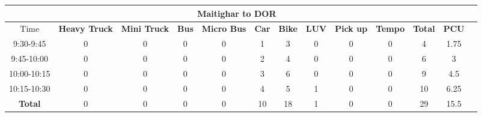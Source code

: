 \begin{landscape}
\begin{table}[h!]
\vspace{0.5cm}

\begin{tabular}{|c|c|c|c|c|c|c|c|c|c|c|c|c|}
    \hline
    \multicolumn{12}{|c|}{\textbf{Maitighar to DOR}} \\
    \hline
        Time & \textbf{Heavy Truck} & \textbf{Mini Truck} & \textbf{Bus} & \textbf{Micro Bus} & \textbf{Car} & \textbf{Bike} & \textbf{LUV} & \textbf{Pick up} & \textbf{Tempo} & \textbf{\textbf{Total}} & \textbf{PCU} \\
    \hline
    9:30-9:45	&0	&0	&0	&0	&1	&3	&0	&0	&0	&4	&1.75 \\ \hline
    9:45-10:00	&0	&0	&0	&0	&2	&4	&0	&0	&0	&6	&3 \\ \hline
    10:00-10:15	&0	&0	&0	&0	&3	&6	&0	&0	&0	&9	&4.5 \\ \hline
    10:15-10:30	&0	&0	&0	&0	&4	&5	&1	&0	&0	&10	&6.25 \\ \hline
    \textbf{Total} & 0 & 0 & 0 & 0 & 10 & 18 & 1 & 0 & 0 & 29 & 15.5 \\ \hline

\end{tabular}

\end{table}
\end{landscape}


